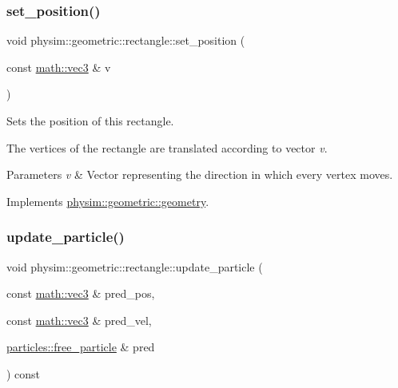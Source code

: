 \subsubsection{\texorpdfstring{set\+\_\+position()}{set\_position()}}
{\footnotesize\ttfamily void physim\+::geometric\+::rectangle\+::set\+\_\+position (\begin{DoxyParamCaption}\item[{const \hyperlink{structphysim_1_1math_1_1vec3}{math\+::vec3} \&}]{v }\end{DoxyParamCaption})\hspace{0.3cm}{\ttfamily [virtual]}}



Sets the position of this rectangle. 

The vertices of the rectangle are translated according to vector {\itshape v}. 
\begin{DoxyParams}{Parameters}
{\em v} & Vector representing the direction in which every vertex moves. \\
\hline
\end{DoxyParams}


Implements \hyperlink{classphysim_1_1geometric_1_1geometry_a5b029b5fa8e55847d5aa06b1d341c88c}{physim\+::geometric\+::geometry}.

\mbox{\label{classphysim_1_1geometric_1_1rectangle_a38e4eaa8bff24511cd3a9d94cd04e3dd}} 
\subsubsection{\texorpdfstring{update\+\_\+particle()}{update\_particle()}\hspace{0.1cm}{\footnotesize\ttfamily [1/2]}}
{\footnotesize\ttfamily void physim\+::geometric\+::rectangle\+::update\+\_\+particle (\begin{DoxyParamCaption}\item[{const \hyperlink{structphysim_1_1math_1_1vec3}{math\+::vec3} \&}]{pred\+\_\+pos,  }\item[{const \hyperlink{structphysim_1_1math_1_1vec3}{math\+::vec3} \&}]{pred\+\_\+vel,  }\item[{\hyperlink{classphysim_1_1particles_1_1free__particle}{particles\+::free\+\_\+particle} \&}]{pred }\end{DoxyParamCaption}) const\hspace{0.3cm}{\ttfamily [virtual]}}




